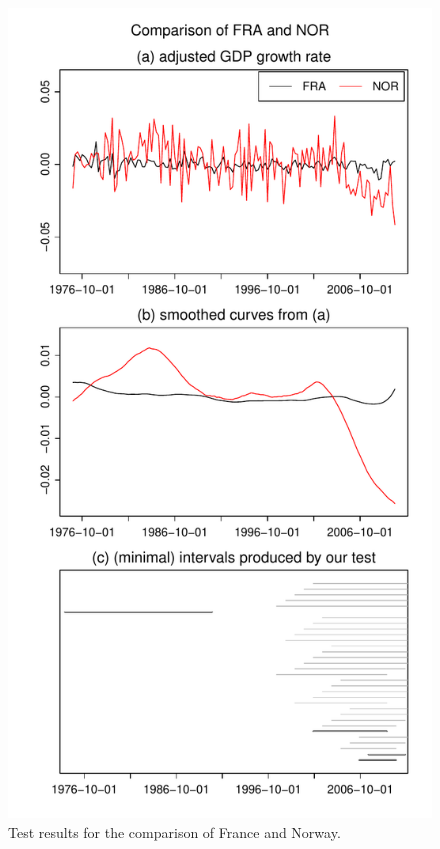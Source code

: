 \documentclass[a4paper,12pt]{article}
\begin{document}
\begin{figure}
\begin{minipage}[t]{0.24\textwidth}
\includegraphics[width=\textwidth]{output/plots/gdp/FRA_vs_NOR}
\caption{Test results for the comparison of France and Norway.}\label{fig:France:Norway}
\end{minipage}
\hspace{0.1cm}
\begin{minipage}[t]{0.24\textwidth}

\end{minipage}
\end{figure}
\end{document}
